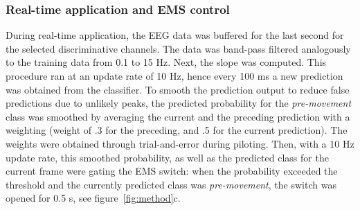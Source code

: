 \subsubsection{Real-time application and EMS control}
During real-time application, the EEG data was buffered for the last second for the selected discriminative channels. The data was band-pass filtered analogously to the training data from 0.1 to 15 Hz. Next, the slope was computed. This procedure ran at an update rate of 10 Hz, hence every 100 ms a new prediction was obtained from the classifier. To smooth the prediction output to reduce false predictions due to unlikely peaks, the predicted probability for the \textit{pre-movement} class was smoothed by averaging the current and the preceding prediction with a weighting (weight of .3 for the preceding, and .5 for the current prediction). The weights were obtained through trial-and-error during piloting. Then, with a 10 Hz update rate, this smoothed probability, as well as the predicted class for the current frame were gating the EMS switch: when the probability exceeded the threshold and the currently predicted class was \textit{pre-movement}, the switch was opened for 0.5 s, see figure~\ref{fig:method}c.


